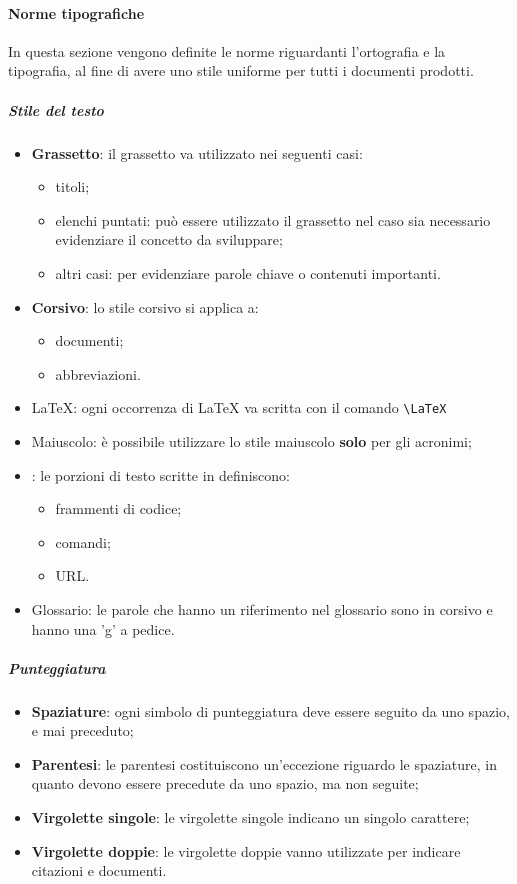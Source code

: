 	\paragraph{Norme tipografiche}
	In questa sezione vengono definite le norme riguardanti l'ortografia e la tipografia, al fine di avere uno stile uniforme per tutti i documenti prodotti.
	\subparagraph{Stile del testo}
		\begin{itemize}
			\item \textbf{Grassetto}: il grassetto va utilizzato nei seguenti casi:
			\begin{itemize}
				\item titoli;
				\item elenchi puntati: può essere utilizzato il grassetto nel caso sia necessario evidenziare il concetto da sviluppare;
				\item altri casi: per evidenziare parole chiave o contenuti importanti.
			\end{itemize}
			\item \textbf{Corsivo}: lo stile corsivo si applica a:
			\begin{itemize}
				\item documenti;
				\item abbreviazioni.
			\end{itemize}
			\item \LaTeX: ogni occorrenza di \LaTeX{} va scritta con il comando \texttt{\textbackslash LaTeX}
			\item Maiuscolo: è possibile utilizzare lo stile maiuscolo \textbf{solo} per gli acronimi;
			\item {}: le porzioni di testo scritte in  definiscono:
			\begin{itemize}
				\item frammenti di codice;
				\item comandi;
				\item URL.
			\end{itemize} 
			\item Glossario: le parole che hanno un riferimento nel glossario sono in corsivo e hanno una 'g' a pedice.
		\end{itemize}
	\subparagraph{Punteggiatura}
		\begin{itemize}
			\item \textbf{Spaziature}: ogni simbolo di punteggiatura deve essere seguito da uno spazio, e mai preceduto;
			\item \textbf{Parentesi}: le parentesi costituiscono un'eccezione riguardo le spaziature, in quanto devono essere precedute da uno spazio, ma non seguite;
			\item \textbf{Virgolette singole}: le virgolette singole indicano un singolo carattere;
			\item \textbf{Virgolette doppie}: le virgolette doppie vanno utilizzate per indicare citazioni e documenti.
		\end{itemize}
